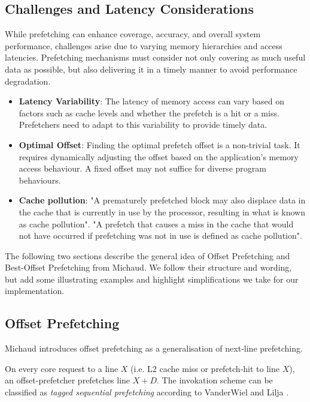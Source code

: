 \documentclass[conference]{IEEEtran}
\begin{document}
\subsection{Challenges and Latency Considerations}

While prefetching can enhance coverage, accuracy, and overall system performance, challenges arise due to varying memory hierarchies and access latencies. Prefetching mechanisms must consider not only covering as much useful data as possible, but also delivering it in a timely manner to avoid performance degradation\cite{Background}.

\begin{itemize}
    \item \textbf{Latency Variability}: The latency of memory access can vary based on factors such as cache levels and whether the prefetch is a hit or a miss. Prefetchers need to adapt to this variability to provide timely data.
    \item \textbf{Optimal Offset}: Finding the optimal prefetch offset is a non-trivial task. It requires dynamically adjusting the offset based on the application's memory access behaviour. A fixed offset may not suffice for diverse program behaviours.
    \item \textbf{Cache pollution}: "A prematurely prefetched block may also displace data in the cache that is currently in use by the processor, resulting in what is known as cache pollution"\cite{Cache_pollution}. "A prefetch that causes a miss in the cache that would not have occurred if prefetching was not in use is defined as cache pollution"\cite{Background}.
\end{itemize}


The following two sections describe the general idea of Offset Prefetching and Best-Offset Prefetching from Michaud\cite{BOP_2016}.
We follow their structure and wording, but add some illustrating examples
and highlight simplifications we take for our implementation.

\subsection{Offset Prefetching}

Michaud\cite{BOP_2016} introduces offset prefetching as a generalisation of next-line prefetching.

On every core request to a line $X$ (i.e. L2 cache miss or prefetch-hit to line $X$),
an offset-prefetcher prefetches line $X+D$.
The invokation scheme can be classified as \textit{tagged sequential prefetching} according to VanderWiel and Lilja \cite{wiel_lilja_2000_data_prefetch_mechanisms}.
\end{document}
